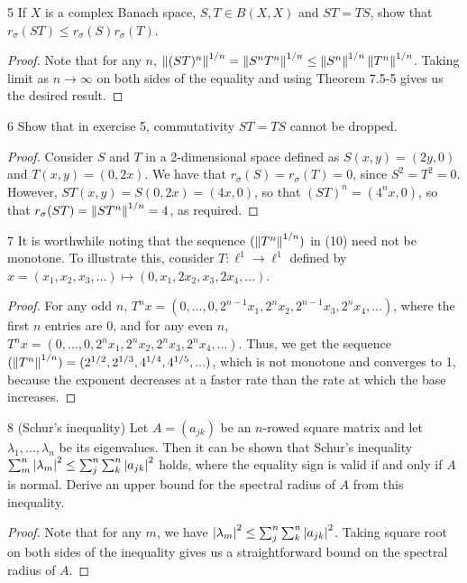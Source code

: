 \begin{exercise}{5}
If $X$ is a complex Banach space, $S, T \in B(X, X)$ and $ST = TS$, show that $r_\sigma(ST) \leq r_\sigma(S) r_\sigma(T)$.
\end{exercise}
\begin{proof}
Note that for any $n$, $\left\lVert (ST)^n\right\rVert^{1/n} = \left\lVert S^n T^n\right\rVert^{1/n} \leq \left\lVert S^n\right\rVert^{1/n} \left\lVert T^n\right\rVert^{1/n}$.
Taking limit as $n \to \infty$ on both sides of the equality and using Theorem 7.5-5 gives us the desired result.
\end{proof} 

\begin{exercise}{6}
Show that in exercise 5, commutativity $ST = TS$ cannot be dropped.
\end{exercise}
\begin{proof}
Consider $S$ and $T$ in a 2-dimensional space defined as $S(x,y) = (2y, 0)$ and $T(x,y) = (0,2x)$.
We have that $r_\sigma(S) = r_\sigma(T) = 0$, since $S^2 = T^2 = 0$.
However, $ST(x, y) = S(0,2x) = (4x, 0)$, so that $(ST)^n = (4^n x, 0)$, so that $r_\sigma(ST) = \left\lVert ST^n\right\rVert^{1/n} = 4$, as required.
\end{proof} 

\begin{exercise}{7}
It is worthwhile noting that the sequence $(\left\lVert T^n\right\rVert^{1/n})$ in (10) need not be monotone.
To illustrate this, consider $T: \ell^1 \to \ell^1$ defined by $x = (x_1, x_2, x_3, \dots) \mapsto (0, x_1, 2 x_2, x_3, 2 x_4, \dots)$. 
\end{exercise}
\begin{proof}
For any odd $n$, $T^n x = (0, \dots, 0, 2^{n-1} x_1, 2^n x_2, 2^{n-1} x_3, 2^n x_4, \dots)$, where the first $n$ entries are 0, and for any even $n$, $T^n x = (0, \dots, 0, 2^n x_1, 2^n x_2, 2^n x_3, 2^n x_4, \dots)$.
Thus, we get the sequence $(\left\lVert T^n\right\rVert^{1/n}) = (2^{1/2}, 2^{1/3}, 4^{1/4}, 4^{1/5}, ...)$, which is not monotone and converges to 1, because the exponent decreases at a faster rate than the rate at which the base increases.
\end{proof} 

\begin{exercise}{8 (Schur's inequality)}
Let $A = (a_{jk})$ be an $n$-rowed square matrix and let $\lambda_1, \dots, \lambda_n$ be its eigenvalues.
Then it can be shown that Schur's inequality $\sum_m^n \left\lvert \lambda_m\right\rvert^2 \leq \sum_j^n \sum_k^n \left\lvert a_{jk}\right\rvert^2$ holds, where the equality sign is valid if and only if $A$ is normal.
Derive an upper bound for the spectral radius of $A$ from this inequality.
\end{exercise}
\begin{proof}
Note that for any $m$, we have $\left\lvert \lambda_m\right\rvert^2 \leq \sum_j^n \sum_k^n \left\lvert a_{jk}\right\rvert^2$.
Taking square root on both sides of the inequality gives us a straightforward bound on the spectral radius of $A$.
\end{proof} 


